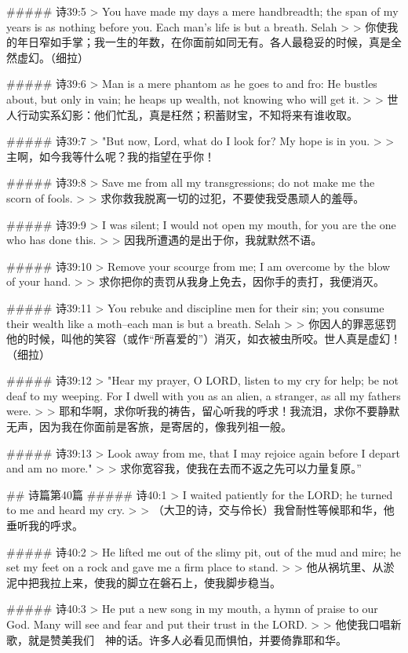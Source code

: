 ##### 诗39:5
> You have made my days a mere handbreadth; the span of my years is as nothing before you. Each man's life is but a breath. Selah
>
> 你使我的年日窄如手掌；我一生的年数，在你面前如同无有。各人最稳妥的时候，真是全然虚幻。（细拉）


##### 诗39:6
> Man is a mere phantom as he goes to and fro: He bustles about, but only in vain; he heaps up wealth, not knowing who will get it.
>
> 世人行动实系幻影：他们忙乱，真是枉然；积蓄财宝，不知将来有谁收取。


##### 诗39:7
> "But now, Lord, what do I look for? My hope is in you.
>
> 主啊，如今我等什么呢？我的指望在乎你！


##### 诗39:8
> Save me from all my transgressions; do not make me the scorn of fools.
>
> 求你救我脱离一切的过犯，不要使我受愚顽人的羞辱。


##### 诗39:9
> I was silent; I would not open my mouth, for you are the one who has done this.
>
> 因我所遭遇的是出于你，我就默然不语。


##### 诗39:10
> Remove your scourge from me; I am overcome by the blow of your hand.
>
> 求你把你的责罚从我身上免去，因你手的责打，我便消灭。


##### 诗39:11
> You rebuke and discipline men for their sin; you consume their wealth like a moth--each man is but a breath. Selah
>
> 你因人的罪恶惩罚他的时候，叫他的笑容（或作“所喜爱的”）消灭，如衣被虫所咬。世人真是虚幻！（细拉）


##### 诗39:12
> "Hear my prayer, O LORD, listen to my cry for help; be not deaf to my weeping. For I dwell with you as an alien, a stranger, as all my fathers were.
>
> 耶和华啊，求你听我的祷告，留心听我的呼求！我流泪，求你不要静默无声，因为我在你面前是客旅，是寄居的，像我列祖一般。


##### 诗39:13
> Look away from me, that I may rejoice again before I depart and am no more."
>
> 求你宽容我，使我在去而不返之先可以力量复原。”


## 诗篇第40篇
##### 诗40:1
> I waited patiently for the LORD; he turned to me and heard my cry.
>
> （大卫的诗，交与伶长）我曾耐性等候耶和华，他垂听我的呼求。


##### 诗40:2
> He lifted me out of the slimy pit, out of the mud and mire; he set my feet on a rock and gave me a firm place to stand.
>
> 他从祸坑里、从淤泥中把我拉上来，使我的脚立在磐石上，使我脚步稳当。


##### 诗40:3
> He put a new song in my mouth, a hymn of praise to our God. Many will see and fear and put their trust in the LORD.
>
> 他使我口唱新歌，就是赞美我们　神的话。许多人必看见而惧怕，并要倚靠耶和华。


